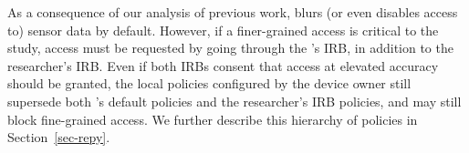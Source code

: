\begin{comment}
\textbf{Default and customizable policies.}
For sensors of low and moderate risk, the default policies are listed in 
Table~\ref{tab:default}. Our principle to design the the default policies 
is that a device or its owner cannot be identifiable, but research projects
are allowed to get data at a level that is meaningful. For example, Bluetooth
and WiFi network MAC addresses can uniquely identify a device, therefore, 
the default policy for these sensor data is to return randomized MAC 
addresses to an experiment, as in~\cite{aditya2014encore}, and this is 
mandatory (marked by N/A). For research projects that are interested 
in monitoring human activity, wireless network performance, etc., sensor
values are allowed to the granularity that is safe. Some data can be 
accessed at full precision (cellular signal strength, WiFi link speed), 
whereas others have an upper bound on their access frequency. 
\yanyan{how to add frequency to the table?}

\end{comment}


As a consequence of our analysis of previous work, \sysname blurs (or 
even disables access to) sensor data by default.
However, if a finer-grained access is critical to the study, access 
must be requested by going through the \sysname's IRB, in addition to the 
researcher's IRB. Even if both IRBs consent that access at elevated accuracy 
should be granted, the local policies configured by the device owner still 
supersede both \sysname's default policies and the researcher's IRB policies, 
and may still block fine-grained access. We further describe this hierarchy 
of policies in Section~\ref{sec-repy}.


